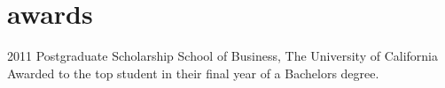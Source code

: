 \documentclass[]{k-cv} %
\begin{document}

\section{awards}

\begin{entrylist}
\entry
{2011}
{Postgraduate Scholarship}
{School of Business, The University of California}
{Awarded to the top student in their final year of a Bachelors degree.}
\end{entrylist}




\end{document}
